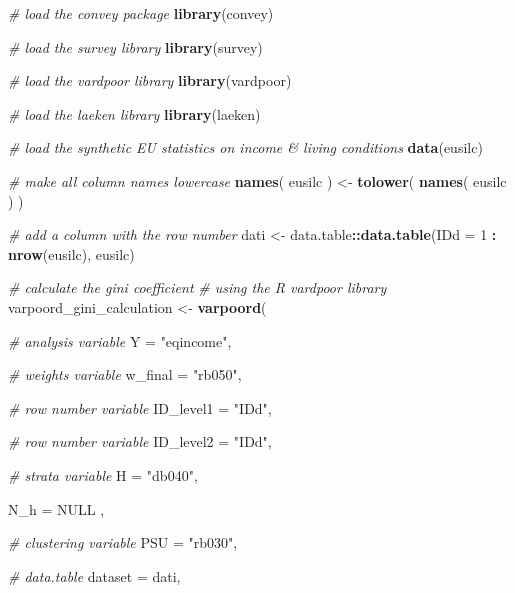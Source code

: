 \documentclass[]{book}
\newenvironment{Shaded}{\begin{snugshade}}{\end{snugshade}}
\newcommand{\CommentTok}[1]{\textcolor[rgb]{0.56,0.35,0.01}{\textit{#1}}}
\newcommand{\DataTypeTok}[1]{\textcolor[rgb]{0.13,0.29,0.53}{#1}}
\newcommand{\DecValTok}[1]{\textcolor[rgb]{0.00,0.00,0.81}{#1}}
\newcommand{\KeywordTok}[1]{\textcolor[rgb]{0.13,0.29,0.53}{\textbf{#1}}}
\newcommand{\NormalTok}[1]{#1}
\newcommand{\OperatorTok}[1]{\textcolor[rgb]{0.81,0.36,0.00}{\textbf{#1}}}
\newcommand{\OtherTok}[1]{\textcolor[rgb]{0.56,0.35,0.01}{#1}}
\newcommand{\StringTok}[1]{\textcolor[rgb]{0.31,0.60,0.02}{#1}}
\begin{document}
\begin{Shaded}
\begin{Highlighting}[]
\CommentTok{# load the convey package}
\KeywordTok{library}\NormalTok{(convey)}

\CommentTok{# load the survey library}
\KeywordTok{library}\NormalTok{(survey)}

\CommentTok{# load the vardpoor library}
\KeywordTok{library}\NormalTok{(vardpoor)}

\CommentTok{# load the laeken library}
\KeywordTok{library}\NormalTok{(laeken)}

\CommentTok{# load the synthetic EU statistics on income & living conditions}
\KeywordTok{data}\NormalTok{(eusilc)}

\CommentTok{# make all column names lowercase}
\KeywordTok{names}\NormalTok{( eusilc ) <-}\StringTok{ }\KeywordTok{tolower}\NormalTok{( }\KeywordTok{names}\NormalTok{( eusilc ) )}

\CommentTok{# add a column with the row number}
\NormalTok{dati <-}\StringTok{ }\NormalTok{data.table}\OperatorTok{::}\KeywordTok{data.table}\NormalTok{(}\DataTypeTok{IDd =} \DecValTok{1} \OperatorTok{:}\StringTok{ }\KeywordTok{nrow}\NormalTok{(eusilc), eusilc)}

\CommentTok{# calculate the gini coefficient}
\CommentTok{# using the R vardpoor library}
\NormalTok{varpoord_gini_calculation <-}
\StringTok{    }\KeywordTok{varpoord}\NormalTok{(}
    
        \CommentTok{# analysis variable}
        \DataTypeTok{Y =} \StringTok{"eqincome"}\NormalTok{, }
        
        \CommentTok{# weights variable}
        \DataTypeTok{w_final =} \StringTok{"rb050"}\NormalTok{,}
        
        \CommentTok{# row number variable}
        \DataTypeTok{ID_level1 =} \StringTok{"IDd"}\NormalTok{,}
        
        \CommentTok{# row number variable}
        \DataTypeTok{ID_level2 =} \StringTok{"IDd"}\NormalTok{,}
        
        \CommentTok{# strata variable}
        \DataTypeTok{H =} \StringTok{"db040"}\NormalTok{, }
        
        \DataTypeTok{N_h =} \OtherTok{NULL}\NormalTok{ ,}
        
        \CommentTok{# clustering variable}
        \DataTypeTok{PSU =} \StringTok{"rb030"}\NormalTok{, }
        
        \CommentTok{# data.table}
        \DataTypeTok{dataset =}\NormalTok{ dati, }
        

\end{Highlighting}
\end{Shaded}
\end{document}
